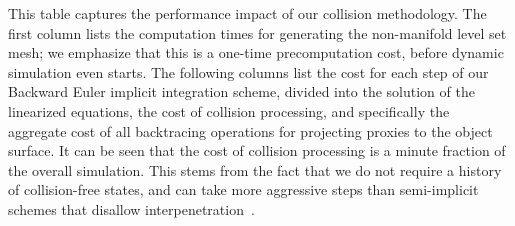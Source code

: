 This table captures the performance impact of our collision
methodology. The first column lists the computation times for
generating the non-manifold level set mesh; we emphasize that this is
a one-time precomputation cost, before dynamic simulation even
starts. The following columns list the cost for each step of our
Backward Euler implicit integration scheme, divided into the solution
of the linearized equations, the cost of collision processing, and
specifically the aggregate cost of all backtracing operations for
projecting proxies to the object surface. It can be seen that the cost
of collision processing is a minute fraction of the overall
simulation. This stems from the fact that we do not require a history
of collision-free states, and can take more aggressive steps than
semi-implicit schemes that disallow
interpenetration~\citep{BridsFA:2002}.





